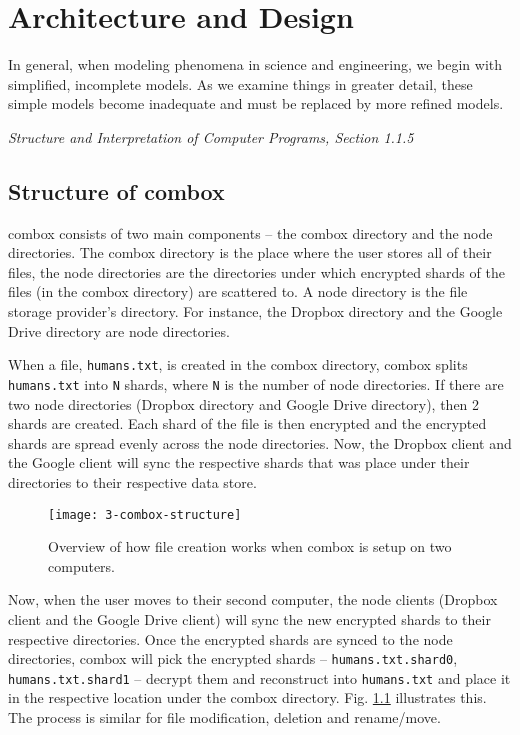 \chapter{Architecture and Design}

\epigraph{In general, when modeling phenomena in science and
  engineering, we begin with simplified, incomplete models. As we
  examine things in greater detail, these simple models become
  inadequate and must be replaced by more refined
  models.}{\textit{Structure and Interpretation of Computer Programs,
    Section 1.1.5} \cite{sicp}}

\section{Structure of combox}

combox consists of two main components -- the combox directory and the
node directories. The combox directory is the place where the user
stores all of their files, the node directories are the directories
under which encrypted shards of the files (in the combox directory)
are scattered to. A node directory is the file storage provider's
directory. For instance, the Dropbox directory and the Google Drive
directory are node directories.

When a file, \verb+humans.txt+, is created in the combox directory,
combox splits \verb+humans.txt+ into \verb+N+ shards, where \verb+N+
is the number of node directories. If there are two node directories
(Dropbox directory and Google Drive directory), then 2 shards are
created. Each shard of the file is then encrypted and the encrypted
shards are spread evenly across the node directories. Now, the Dropbox
client and the Google client will sync the respective shards that was
place under their directories to their respective data store.

\begin{figure}[h]
  \texttt{[image: 3-combox-structure]}
  \caption{Overview of how file creation works when combox is setup on
    two computers.}
  \label{fig:3-combox-structure}
\end{figure}

Now, when the user moves to their second computer, the node clients
(Dropbox client and the Google Drive client) will sync the new
encrypted shards to their respective directories. Once the encrypted
shards are synced to the node directories, combox will pick the
encrypted shards -- \verb+humans.txt.shard0+, \verb+humans.txt.shard1+
-- decrypt them and reconstruct into \verb+humans.txt+ and place it in
the respective location under the combox directory.
Fig. \ref{fig:3-combox-structure} illustrates this. The process is
similar for file modification, deletion and rename/move.

